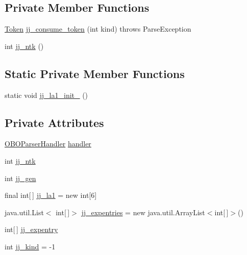 \subsection*{Private Member Functions}
\begin{DoxyCompactItemize}
\item 
\hyperlink{classorg_1_1coode_1_1owlapi_1_1obo_1_1parser_1_1_token}{Token} \hyperlink{classorg_1_1coode_1_1owlapi_1_1obo_1_1parser_1_1_o_b_o_parser_a149a57878d2942304fcaf174a865ac77}{jj\-\_\-consume\-\_\-token} (int kind)  throws Parse\-Exception 
\item 
int \hyperlink{classorg_1_1coode_1_1owlapi_1_1obo_1_1parser_1_1_o_b_o_parser_acd2d61ec6a91367f0c2f9ca25e39372b}{jj\-\_\-ntk} ()
\end{DoxyCompactItemize}
\subsection*{Static Private Member Functions}
\begin{DoxyCompactItemize}
\item 
static void \hyperlink{classorg_1_1coode_1_1owlapi_1_1obo_1_1parser_1_1_o_b_o_parser_a9260e6ab5bf822e534954c7d81318972}{jj\-\_\-la1\-\_\-init\-\_} ()
\end{DoxyCompactItemize}
\subsection*{Private Attributes}
\begin{DoxyCompactItemize}
\item 
\hyperlink{interfaceorg_1_1coode_1_1owlapi_1_1obo_1_1parser_1_1_o_b_o_parser_handler}{O\-B\-O\-Parser\-Handler} \hyperlink{classorg_1_1coode_1_1owlapi_1_1obo_1_1parser_1_1_o_b_o_parser_a7ce0c0b2026ce6ae3bf0362e878ca160}{handler}
\item 
int \hyperlink{classorg_1_1coode_1_1owlapi_1_1obo_1_1parser_1_1_o_b_o_parser_a54cd9ff975c951ac09b46300b87cca21}{jj\-\_\-ntk}
\item 
int \hyperlink{classorg_1_1coode_1_1owlapi_1_1obo_1_1parser_1_1_o_b_o_parser_ac9d1de49c7505528f6f58dd78ce85542}{jj\-\_\-gen}
\item 
final int\mbox{[}$\,$\mbox{]} \hyperlink{classorg_1_1coode_1_1owlapi_1_1obo_1_1parser_1_1_o_b_o_parser_ae6e100ef9cc15b28f1ea653983a47aa1}{jj\-\_\-la1} = new int\mbox{[}6\mbox{]}
\item 
java.\-util.\-List$<$ int\mbox{[}$\,$\mbox{]}$>$ \hyperlink{classorg_1_1coode_1_1owlapi_1_1obo_1_1parser_1_1_o_b_o_parser_a23c14521433c5bdf2bcfc7e9480958a0}{jj\-\_\-expentries} = new java.\-util.\-Array\-List$<$int\mbox{[}$\,$\mbox{]}$>$()
\item 
int\mbox{[}$\,$\mbox{]} \hyperlink{classorg_1_1coode_1_1owlapi_1_1obo_1_1parser_1_1_o_b_o_parser_a64f61cf8a228ce3a1aed3f1cf3059347}{jj\-\_\-expentry}
\item 
int \hyperlink{classorg_1_1coode_1_1owlapi_1_1obo_1_1parser_1_1_o_b_o_parser_aa2a81c2739a16598d13d9eb8d462b213}{jj\-\_\-kind} = -\/1
\end{DoxyCompactItemize}

